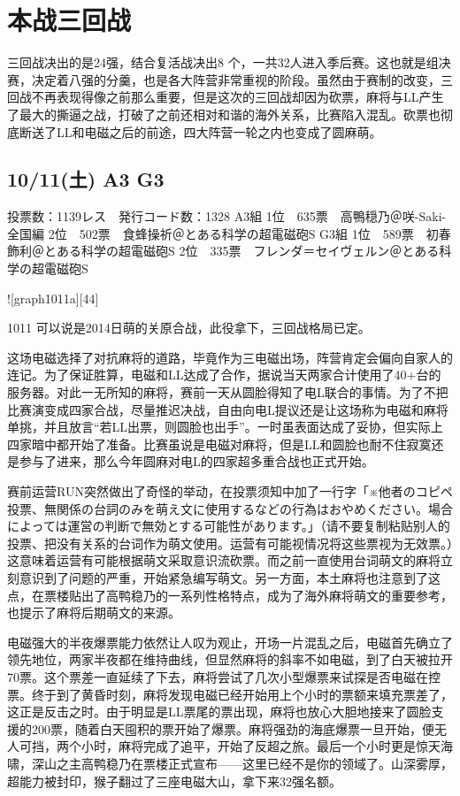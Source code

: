 \section{本战三回战}

三回战决出的是24强，结合复活战决出8 个，一共32人进入季后赛。这也就是组决赛，决定着八强的分羹，也是各大阵营非常重视的阶段。虽然由于赛制的改变，三回战不再表现得像之前那么重要，但是这次的三回战却因为砍票，麻将与LL产生了最大的撕逼之战，打破了之前还相对和谐的海外关系，比赛陷入混乱。砍票也彻底断送了LL和电磁之后的前途，四大阵营一轮之内也变成了圆麻萌。

\subsection{10/11(土) A3 G3}

	投票数：1139レス　発行コード数：1328
	A3組
	1位　635票　高鴨穏乃＠咲-Saki- 全国編
	2位　502票　食蜂操祈＠とある科学の超電磁砲S
	G3組
	1位　589票　初春飾利＠とある科学の超電磁砲S
	2位　335票　フレンダ＝セイヴェルン＠とある科学の超電磁砲S

![graph1011a][44]

1011 可以说是2014日萌的关原合战，此役拿下，三回战格局已定。

这场电磁选择了对抗麻将的道路，毕竟作为三电磁出场，阵营肯定会偏向自家人的连记。为了保证胜算，电磁和LL达成了合作，据说当天两家合计使用了40+台的服务器。对此一无所知的麻将，赛前一天从圆脸得知了电L联合的事情。为了不把比赛演变成四家合战，尽量推迟决战，自由向电L提议还是让这场称为电磁和麻将单挑，并且放言“若LL出票，则圆脸也出手”。一时虽表面达成了妥协，但实际上四家暗中都开始了准备。比赛虽说是电磁对麻将，但是LL和圆脸也耐不住寂寞还是参与了进来，那么今年圆麻对电L的四家超多重合战也正式开始。

赛前运营RUN突然做出了奇怪的举动，在投票须知中加了一行字「※他者のコピペ投票、無関係の台詞のみを萌え文に使用するなどの行為はおやめください。場合によっては運営の判断で無効とする可能性があります。」（请不要复制粘贴别人的投票、把没有关系的台词作为萌文使用。运营有可能视情况将这些票视为无效票。）这意味着运营有可能根据萌文采取意识流砍票。而之前一直使用台词萌文的麻将立刻意识到了问题的严重，开始紧急编写萌文。另一方面，本土麻将也注意到了这点，在票楼贴出了高鸭稳乃的一系列性格特点，成为了海外麻将萌文的重要参考，也提示了麻将后期萌文的来源。

电磁强大的半夜爆票能力依然让人叹为观止，开场一片混乱之后，电磁首先确立了领先地位，两家半夜都在维持曲线，但显然麻将的斜率不如电磁，到了白天被拉开70票。这个票差一直延续了下去，麻将尝试了几次小型爆票来试探是否电磁在控票。终于到了黄昏时刻，麻将发现电磁已经开始用上个小时的票额来填充票差了，这正是反击之时。由于明显是LL票尾的票出现，麻将也放心大胆地接来了圆脸支援的200票，随着白天囤积的票开始了爆票。麻将强劲的海底爆票一旦开始，便无人可挡，两个小时，麻将完成了追平，开始了反超之旅。最后一个小时更是惊天海啸，深山之主高鸭稳乃在票楼正式宣布——这里已经不是你的领域了。山深雾厚，超能力被封印，猴子翻过了三座电磁大山，拿下来32强名额。

